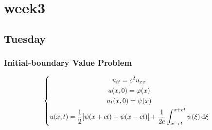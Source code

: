 


\chapter{week3}

\section{Tuesday}
\subsection{Initial-boundary Value Problem}
\[\left\{\begin{gathered}u_{tt}=c^2u_{xx}\\u(x,0)=\varphi(x)\\u_t(x,0)=\psi(x)\\u(x,t)=\frac{1}{2}[\psi(x+ct)+\psi(x-ct)]+\frac{1}{2c}\int_{x-ct}^{x+ct}\psi(\xi)\,\mathrm{d} \xi\end{gathered}\right.
\]





